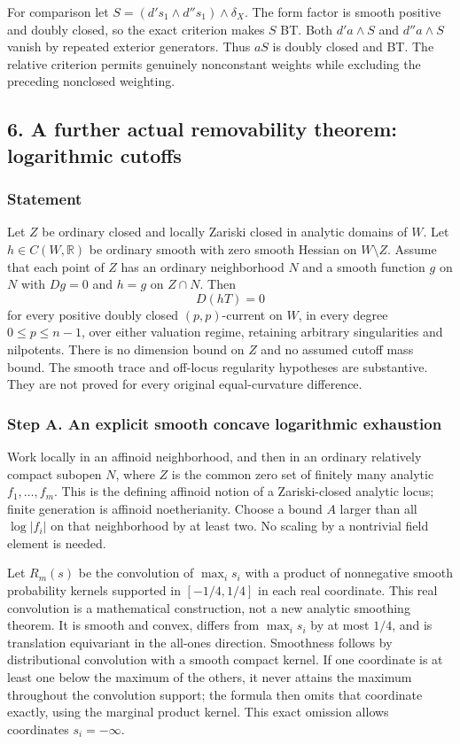 \documentclass[11pt]{article}
\begin{document}
For comparison let \(S=(d's_1\wedge d''s_1)\wedge\delta_X\). The form factor is smooth positive and doubly closed, so the exact criterion makes \(S\) BT. Both \(d'a\wedge S\) and \(d''a\wedge S\) vanish by repeated exterior generators. Thus \(aS\) is doubly closed and BT. The relative criterion permits genuinely nonconstant weights while excluding the preceding nonclosed weighting.

\subsection{6. A further actual removability theorem: logarithmic cutoffs}

\subsubsection{Statement}

Let \(Z\) be ordinary closed and locally Zariski closed in analytic domains of \(W\). Let \(h\in C(W,\mathbb R)\) be ordinary smooth with zero smooth Hessian on \(W\setminus Z\). Assume that each point of \(Z\) has an ordinary neighborhood \(N\) and a smooth function \(g\) on \(N\) with \(Dg=0\) and \(h=g\) on \(Z\cap N\). Then
\[
 D(hT)=0
\]
for every positive doubly closed \((p,p)\)-current on \(W\), in every degree \(0\leq p\leq n-1\), over either valuation regime, retaining arbitrary singularities and nilpotents. There is no dimension bound on \(Z\) and no assumed cutoff mass bound. The smooth trace and off-locus regularity hypotheses are substantive. They are not proved for every original equal-curvature difference.

\subsubsection{Step A. An explicit smooth concave logarithmic exhaustion}

Work locally in an affinoid neighborhood, and then in an ordinary relatively compact subopen \(N\), where \(Z\) is the common zero set of finitely many analytic \(f_1,\ldots,f_m\). This is the defining affinoid notion of a Zariski-closed analytic locus; finite generation is affinoid noetherianity. Choose a bound \(A\) larger than all \(\log|f_i|\) on that neighborhood by at least two. No scaling by a nontrivial field element is needed.

Let \(R_m(s)\) be the convolution of \(\max_i s_i\) with a product of nonnegative smooth probability kernels supported in \([-1/4,1/4]\) in each real coordinate. This real convolution is a mathematical construction, not a new analytic smoothing theorem. It is smooth and convex, differs from \(\max_i s_i\) by at most \(1/4\), and is translation equivariant in the all-ones direction. Smoothness follows by distributional convolution with a smooth compact kernel. If one coordinate is at least one below the maximum of the others, it never attains the maximum throughout the convolution support; the formula then omits that coordinate exactly, using the marginal product kernel. This exact omission allows coordinates \(s_i=-\infty\).
\end{document}
